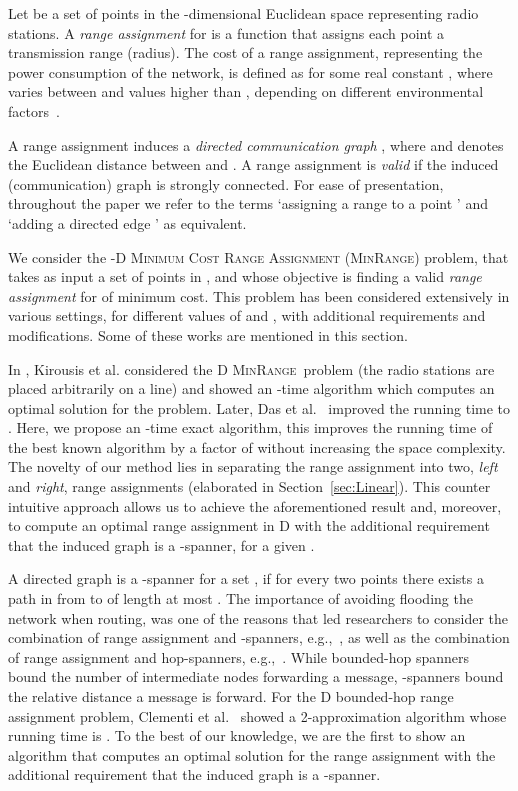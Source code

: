 \documentclass[a4paper]{article}
\newcommand{\MCRA}{\textsc{MinRange}}
\begin{document}
Let  be a set of points in the -dimensional Euclidean space representing radio stations.
A \emph{range assignment} for  is a function  that assigns each point a transmission range (radius). 
The cost of a range assignment, representing the power consumption of the network, is defined as 
 for some real constant , 
where  varies between  and values higher than , depending on different environmental factors~\cite{pahlavan2005}.


A range assignment  induces a \emph{directed communication graph}
, where  and  denotes the Euclidean distance between  and . 
A range assignment  is \emph{valid} if the induced (communication) graph  is strongly connected.
For ease of presentation, throughout the paper we refer to the terms `assigning a range  to a point ' 
and `adding a directed edge ' as equivalent.

We consider the -D \textsc{Minimum Cost Range Assignment} (\MCRA) problem,
that takes as input a set  of  points in ,
and whose objective is finding a valid \emph{range assignment} for 
of minimum cost.
This problem has been considered extensively in various settings, for different values of  and , 
with additional requirements and modifications.
Some of these works are mentioned in this section.


In \cite{Kirousis}, Kirousis et al. considered the D \MCRA\ problem (the radio stations are placed
arbitrarily on a line) and showed an -time algorithm which computes an optimal solution for the problem.
Later, Das et al.~\cite{DasGN07} improved the running time to . Here, we propose an -time exact algorithm, 
this improves the running time of the best known algorithm by a factor of  without increasing the space complexity. 
The novelty of our method lies in separating the range assignment into two, \emph{left} and \emph{right}, range assignments
(elaborated in Section~\ref{sec:Linear}). 
This counter intuitive approach allows us to achieve the aforementioned result and, moreover,
to compute an optimal range assignment in D with 
the additional requirement that the induced graph is a -spanner, for a given .


A directed graph  is a -spanner for a set , if for every two points  
there exists a path in  from  to  of length at most .
The importance of avoiding flooding the network when routing, 
was one of the reasons that led researchers to consider the combination of range assignment and -spanners, 
e.g.,~\cite{KarimRCK09,Shpungin,WYLX02,WangLi}, 
as well as the combination of range assignment and hop-spanners, e.g.,~\cite{Clementi00,Kirousis}.
While bounded-hop spanners bound the number of intermediate nodes forwarding a message, -spanners bound the relative distance a message is forward. 
For the D bounded-hop range assignment problem, Clementi et al.~\cite{Clementi00} showed a 2-approximation algorithm 
whose running time is .
To the best of our knowledge, we are the first to show an algorithm that computes an optimal solution for the 
range assignment with the additional requirement that the induced graph is a -spanner.  
\end{document}
